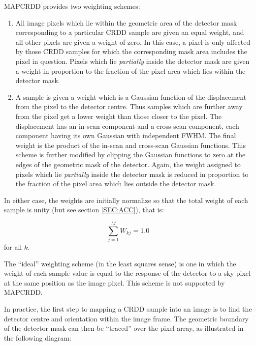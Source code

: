 MAPCRDD provides two weighting schemes:
\begin{enumerate}
\item All image pixels which lie within the geometric area of the detector mask
corresponding to a particular CRDD sample are given an equal weight, and all
other pixels are given a weight of zero. In this case, a pixel is only affected
by those CRDD samples for which the corresponding mask area includes the pixel
in question. Pixels which lie {\em partially} inside the detector mask are given
a weight in proportion to the fraction of the pixel area which lies within the
detector mask.
\item A sample is given a weight which is a Gaussian function of the
displacement from the pixel to the detector centre. Thus samples which are
further away from the pixel get a lower weight than those closer to the pixel.
The displacement has an in-scan component and a cross-scan component, each
component having its own Gaussian with independent FWHM. The final weight is the
product of the in-scan and cross-scan Gaussian functions. This scheme is further
modified by clipping the Gaussian functions to zero at the edges of the
geometric mask of the detector. Again, the weight assigned to pixels which lie
{\em partially} inside the detector mask is reduced in proportion to the
fraction of the pixel area which lies outside the detector mask.

\end{enumerate}

In either case, the weights are initially normalize so that the total weight of
each sample is unity (but see section \ref {SEC:ACC}), that is:

\begin{equation}
\sum_{j=1}^{M}W_{kj}=1.0
\label {EQ:WS}
\end{equation}
for all $k$.

The ``ideal'' weighting scheme (in the least squares sense) is one in which the
weight of each sample value is equal to the response of the detector to a sky
pixel at the same position as the image pixel. This scheme is not supported by
MAPCRDD.

In practice, the first step to mapping a CRDD sample into an image is to find
the detector centre and orientation within the image frame. The geometric
boundary of the detector mask can then be ``traced'' over the pixel array, as
illustrated in the following diagram:

